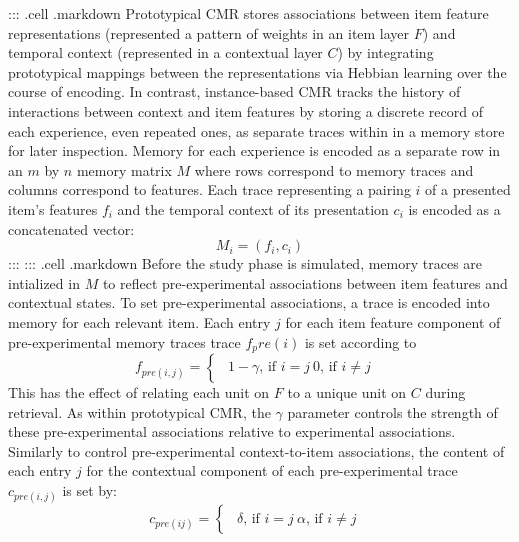 {}::: {.cell .markdown} Prototypical CMR stores associations between item feature representations (represented a pattern of weights in an item layer $F$) and temporal context (represented in a contextual layer $C$) by integrating prototypical mappings between the representations via Hebbian learning over the course of encoding. In contrast, instance-based CMR tracks the history of interactions between context and item features by storing a discrete record of each experience, even repeated ones, as separate traces within in a memory store for later inspection. Memory for each experience is encoded as a separate row in an $m$ by $n$ memory matrix $M$ where rows correspond to memory traces and columns correspond to features. Each trace representing a pairing $i$ of a presented item's features $f_i$ and the temporal context of its presentation $c_i$ is encoded as a concatenated vector:\markdownRendererInterblockSeparator
{}\begin{equation} \label{eq:14}M_i = (f_i, c_i)\end{equation} :::\markdownRendererInterblockSeparator
{}::: {.cell .markdown}\markdownRendererInterblockSeparator
{}\markdownRendererInterblockSeparator
{}Before the study phase is simulated, memory traces are intialized in $M$ to reflect pre-experimental associations between item features and contextual states. To set pre-experimental associations, a trace is encoded into memory for each relevant item. Each entry $j$ for each item feature component of pre-experimental memory traces trace $f_pre(i)$ is set according to\markdownRendererInterblockSeparator
{}$$f_{pre(i, j)} = \begin{cases} \begin{alignedat}{2} 1 - \gamma \text{, if } i=j \ 0 \text{, if } i \neq j\ \end{alignedat} \end{cases}$$\markdownRendererInterblockSeparator
{}This has the effect of relating each unit on $F$ to a unique unit on $C$ during retrieval. As within prototypical CMR, the $\gamma$ parameter controls the strength of these pre-experimental associations relative to experimental associations.\markdownRendererInterblockSeparator
{}Similarly to control pre-experimental context-to-item associations, the content of each entry $j$ for the contextual component of each pre-experimental trace $c_{pre(i,j)}$ is set by:\markdownRendererInterblockSeparator
{}$$c_{pre(ij)} = \begin{cases} \begin{alignedat}{2} \delta \text{, if } i=j \ \alpha \text{, if } i \neq j\ \end{alignedat} \end{cases}$$\markdownRendererInterblockSeparator

